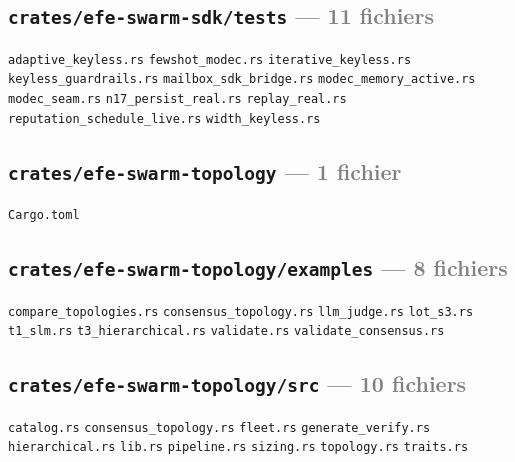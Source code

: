 \documentclass[10pt]{report}
\newcommand{\code}[1]{\texttt{\small #1}}
\begin{document}
\subsection*{\code{crates/efe-swarm-sdk/tests} \normalfont\textcolor{grey}{--- 11 fichiers}}
\begin{sloppypar}\footnotesize\raggedright
\code{adaptive\_keyless.rs} \;\textbullet\; \code{fewshot\_modec.rs} \;\textbullet\; \code{iterative\_keyless.rs} \;\textbullet\; \code{keyless\_guardrails.rs} \;\textbullet\; \code{mailbox\_sdk\_bridge.rs} \;\textbullet\; \code{modec\_memory\_active.rs} \;\textbullet\; \code{modec\_seam.rs} \;\textbullet\; \code{n17\_persist\_real.rs} \;\textbullet\; \code{replay\_real.rs} \;\textbullet\; \code{reputation\_schedule\_live.rs} \;\textbullet\; \code{width\_keyless.rs}
\end{sloppypar}

\subsection*{\code{crates/efe-swarm-topology} \normalfont\textcolor{grey}{--- 1 fichier}}
\begin{sloppypar}\footnotesize\raggedright
\code{Cargo.toml}
\end{sloppypar}

\subsection*{\code{crates/efe-swarm-topology/examples} \normalfont\textcolor{grey}{--- 8 fichiers}}
\begin{sloppypar}\footnotesize\raggedright
\code{compare\_topologies.rs} \;\textbullet\; \code{consensus\_topology.rs} \;\textbullet\; \code{llm\_judge.rs} \;\textbullet\; \code{lot\_s3.rs} \;\textbullet\; \code{t1\_slm.rs} \;\textbullet\; \code{t3\_hierarchical.rs} \;\textbullet\; \code{validate.rs} \;\textbullet\; \code{validate\_consensus.rs}
\end{sloppypar}

\subsection*{\code{crates/efe-swarm-topology/src} \normalfont\textcolor{grey}{--- 10 fichiers}}
\begin{sloppypar}\footnotesize\raggedright
\code{catalog.rs} \;\textbullet\; \code{consensus\_topology.rs} \;\textbullet\; \code{fleet.rs} \;\textbullet\; \code{generate\_verify.rs} \;\textbullet\; \code{hierarchical.rs} \;\textbullet\; \code{lib.rs} \;\textbullet\; \code{pipeline.rs} \;\textbullet\; \code{sizing.rs} \;\textbullet\; \code{topology.rs} \;\textbullet\; \code{traits.rs}
\end{sloppypar}
\end{document}
